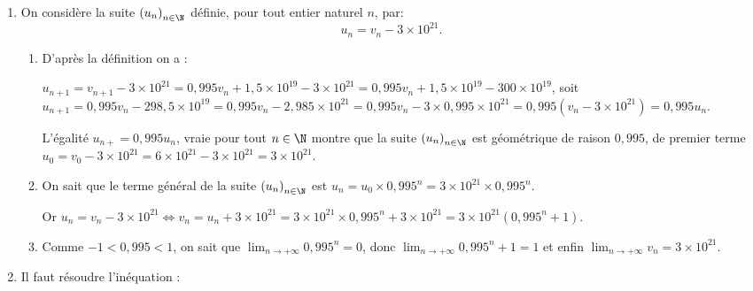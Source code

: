 \begin{enumerate}
\begin{enumerate}
La partie gauche de la proposition montre que la suite $\left(v_n\right)_{n\in \N}$ est minorée par $0$ et la partie de droite montre que la suite $\left(v_n\right)_{n\in \N}$ est décroissante, donc la suite $\left(v_n\right)_{n\in \N}$ est convergente vers un réel $\ell \geqslant 0$.
	\end{enumerate}
\item On considère la suite $\left(u_n\right)_{n \in \N}$ définie, pour tout entier naturel $n$, par: \[u_n = v_n - 3 \times 10^{21}.\]
	\begin{enumerate}
		\item %
D'après la définition on a :

$u_{n+1} = v_{n+1} - 3 \times 10^{21} = 0,995v_n + 1,5 \times 10^{19} - 3 \times 10^{21} = 0,995v_n + 1,5 \times 10^{19} - 300 \times 10^{19}$, soit $u_{n+1} = 0,995v_n - 298,5 \times 10^{19} = 0,995v_n - 2,985 \times 10^{21} = 0,995v_n - 3 \times 0,995\times 10^{21} = 0,995\left(v_n - 3\times 10^{21} \right) = 0,995 u_n$.

L'égalité $u_{n+} = 0,995u_n$, vraie pour tout $n \in \N$ montre que la suite $\left(u_n\right)_{n \in \N}$ est géométrique de raison $0,995$, de premier terme $u_0 = v_0 - 3 \times 10^{21} = 6 \times 10^{21} - 3 \times 10^{21} = 3 \times 10^{21}$.
		\item %
On sait que le terme général de la suite $\left(u_n\right)_{n \in \N}$ est $u_n = u_0 \times 0,995^n = 3 \times 10^{21} \times 0,995^n$.

Or $u_n = v_n - 3 \times 10^{21} \iff v_n = u_n + 3 \times 10^{21} = 3 \times 10^{21} \times 0,995^n + 3 \times 10^{21} = 3 \times 10^{21}\left(0,995^n + 1\right)$.

		\item %
		Comme $- 1 < 0,995 < 1$, on sait que $\displaystyle\lim_{n \to + \infty} 0,995^n = 0$, donc $\displaystyle\lim_{n \to + \infty}0,995^n + 1 = 1$ et enfin $\displaystyle\lim_{n \to + \infty}v_n = 3 \times 10^{21}$.
	\end{enumerate}
\item %
Il faut résoudre l'inéquation :


\end{enumerate}
